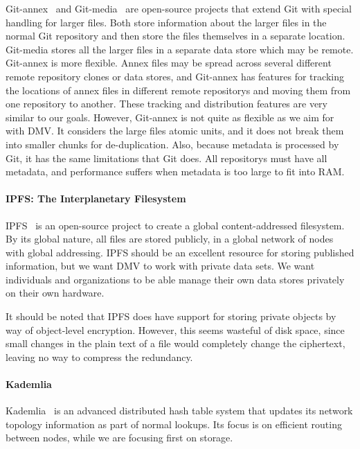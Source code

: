 Git-annex~\cite{git_annex_homepage} and Git-media~\cite{git_media_github} are open-source projects that extend Git with special handling for larger files.
Both store information about the larger files in the normal Git \gls{repository} and then store the files themselves in a separate location.
Git-media stores all the larger files in a separate data store which may be remote.
Git-annex is more flexible.
Annex files may be spread across several different remote \gls{repository} clones or data stores, and Git-annex has features for tracking the locations of annex files in different remote \glspl{repository} and moving them from one \gls{repository} to another.
These tracking and distribution features are very similar to our goals.
However, Git-annex is not quite as flexible as we aim for with \gls{DMV}.
It considers the large files atomic units, and it does not break them into smaller chunks for de-duplication.
Also, because metadata is processed by Git, it has the same limitations that Git does.
All \glspl{repository} must have all metadata, and performance suffers when metadata is too large to fit into RAM.


\paragraph{IPFS: The Interplanetary Filesystem}

IPFS~\cite{ipfs_github_main} is an open-source pro\-ject to create a global content-addressed filesystem.
By its global nature, all files are stored publicly, in a global network of nodes with global addressing.
IPFS should be an excellent resource for storing published information, but we want \gls{DMV} to work with private data sets.
We want individuals and organizations to be able manage their own data stores privately on their own hardware.

It should be noted that IPFS does have support for storing private objects by way of object-level encryption.
However, this seems wasteful of disk space, since small changes in the plain text of a file would completely change the ciphertext, leaving no way to compress the redundancy.


\paragraph{Kademlia}

Kademlia~\cite{Maymounkov2002} is an advanced distributed hash table system that updates its network topology information as part of normal lookups.
Its focus is on efficient routing between nodes, while we are focusing first on storage.


